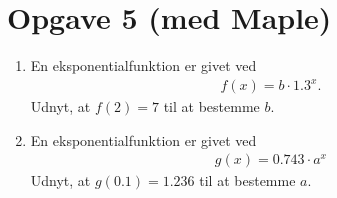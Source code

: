 \section*{Opgave 5 (med Maple)}
\begin{enumerate}[label=\roman*)]
	\item En eksponentialfunktion er givet ved
	\begin{align*}
		f(x) = b \cdot 1.3^x.
	\end{align*}
	Udnyt, at $f(2) = 7$ til at bestemme $b$.
	\item En eksponentialfunktion er givet ved
	\begin{align*}
		g(x) = 0.743\cdot a^x
	\end{align*}
	Udnyt, at $g(0.1) = 1.236$ til at bestemme $a$.  
\end{enumerate}